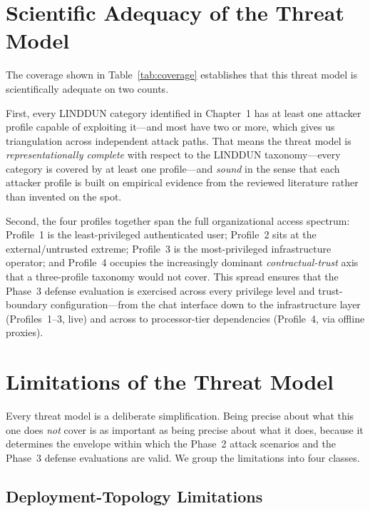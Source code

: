 \documentclass[a4paper,12pt]{report}
\begin{document}
\section{Scientific Adequacy of the Threat Model}

The coverage shown in Table~\ref{tab:coverage} establishes that
this threat model is scientifically adequate on two counts.

First, every LINDDUN category identified in Chapter~1 has at least one
attacker profile capable of exploiting it---and most have two or more,
which gives us triangulation across independent attack paths. That means
the threat model is \emph{representationally complete} with respect to the
LINDDUN taxonomy---every category is covered by at least one profile---and
\emph{sound} in the sense that each attacker profile is
built on empirical evidence from the reviewed literature rather than
invented on the spot.

Second, the four profiles together span the full organizational access
spectrum: Profile~1 is the least-privileged authenticated user; Profile~2
sits at the external/untrusted extreme; Profile~3 is the most-privileged
infrastructure operator; and Profile~4 occupies the increasingly dominant
\emph{contractual-trust} axis that a three-profile taxonomy would not
cover. This spread ensures that the Phase~3 defense evaluation is exercised
across every privilege level and trust-boundary configuration---from the
chat interface down to the infrastructure layer (Profiles~1--3, live) and
across to processor-tier dependencies (Profile~4, via offline proxies).

\section{Limitations of the Threat Model}
\label{sec:limitations}

Every threat model is a deliberate simplification. Being precise about
what this one does \emph{not} cover is as important as being precise
about what it does, because it determines the envelope within which the
Phase~2 attack scenarios and the Phase~3 defense evaluations are valid.
We group the limitations into four classes.

\subsection{Deployment-Topology Limitations}
\end{document}
